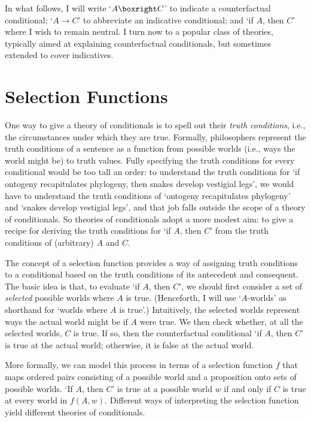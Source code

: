 In what follows, I will write `$A \boxright C$' to indicate a counterfactual conditional; `$A \rightarrow C$' to abbreviate an indicative conditional; and `if $A$, then $C$' where I wish to remain neutral.  I turn now to a popular class of theories, typically aimed at explaining counterfactual conditionals, but sometimes extended to cover indicatives.


\section{Selection Functions}

One way to give a theory of conditionals is to spell out their \emph{truth conditions}, i.e., the circumstances under which they are true.  Formally, philosophers represent the truth conditions of a sentence as a function from possible worlds (i.e., ways the world might be) to truth values.  Fully specifying the truth conditions for every conditional would be too tall an order: to understand the truth conditions for `if ontogeny recapitulates phylogeny, then snakes develop vestigial legs', we would have to understand the truth conditions of `ontogeny recapitulates phylogeny' and `snakes develop vestigial legs', and that job falls outside the scope of a theory of conditionals.  So theories of conditionals adopt a more modest aim: to give a recipe for deriving the truth conditions for `if $A$, then $C$' from the truth conditions of (arbitrary) $A$ and $C$.

The concept of a selection function \citep{stalnaker:conditionals} provides a way of assigning truth conditions to a conditional based on the truth conditions of its antecedent and consequent.  The basic idea is that, to evaluate `if $A$, then $C$', we should first consider a set of \emph{selected} possible worlds where $A$ is true.  (Henceforth, I will use `$A$-worlds' as shorthand for `worlds where $A$ is true'.)    Intuitively, the selected worlds represent ways the actual world might be if $A$ were true.  We then check whether, at all the selected worlds, $C$ is true.  If so, then the counterfactual conditional `if $A$, then $C$' is true at the actual world; otherwise, it is false at the actual world.

More formally, we can model this process in terms of a selection function $f$ that maps ordered pairs consisting of a possible world and a proposition onto sets of possible worlds.  `If $A$, then $C$' is true at a possible world $w$ if and only if $C$ is true at every world in $f(A, w)$. Different ways of interpreting the selection function yield different theories of conditionals.

